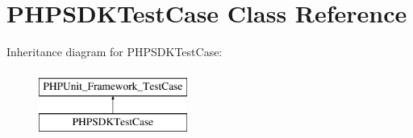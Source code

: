 \hypertarget{classPHPSDKTestCase}{\section{P\-H\-P\-S\-D\-K\-Test\-Case Class Reference}
\label{classPHPSDKTestCase}
}
Inheritance diagram for P\-H\-P\-S\-D\-K\-Test\-Case\-:\begin{figure}[H]
\begin{center}
\leavevmode
\includegraphics[height=2.000000cm]{classPHPSDKTestCase}
\end{center}
\end{figure}
